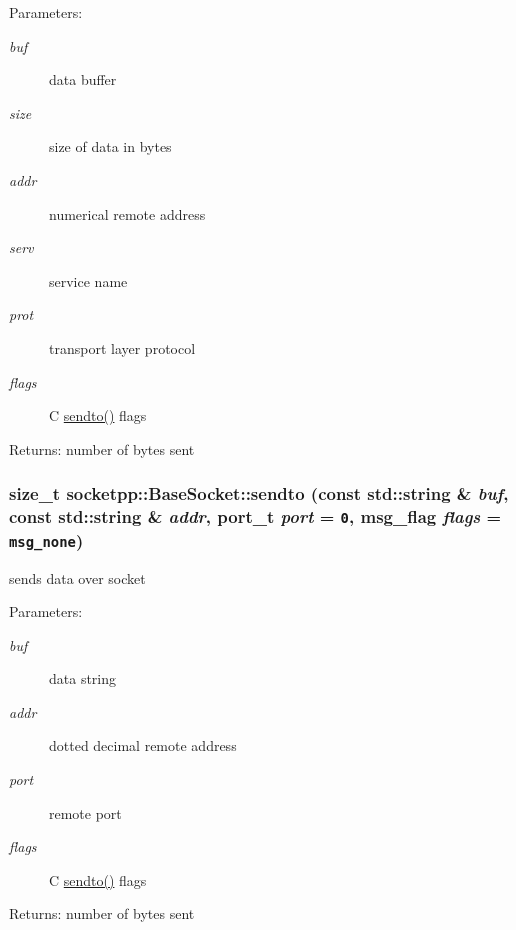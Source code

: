 \begin{CompactItemize}
\begin{Desc}
\item[Parameters:]
\begin{description}
\item[{\em buf}]data buffer \item[{\em size}]size of data in bytes \item[{\em addr}]numerical remote address \item[{\em serv}]service name \item[{\em prot}]transport layer protocol \item[{\em flags}]C \hyperlink{classsocketpp_1_1BaseSocket_d6df36281c6fce81e5c4c493ac91a6f8}{sendto()} flags \end{description}
\end{Desc}
\begin{Desc}
\item[Returns:]number of bytes sent \end{Desc}
\hypertarget{classsocketpp_1_1BaseSocket_63cabdd45f7985f6a63cf11eb2e031c5}{
\subsubsection[{sendto}]{\setlength{\rightskip}{0pt plus 5cm}size\_\-t socketpp::BaseSocket::sendto (const std::string \& {\em buf}, \/  const std::string \& {\em addr}, \/  port\_\-t {\em port} = {\tt 0}, \/  msg\_\-flag {\em flags} = {\tt msg\_\-none})}}
\label{classsocketpp_1_1BaseSocket_63cabdd45f7985f6a63cf11eb2e031c5}


sends data over socket 

\begin{Desc}
\item[Parameters:]
\begin{description}
\item[{\em buf}]data string \item[{\em addr}]dotted decimal remote address \item[{\em port}]remote port \item[{\em flags}]C \hyperlink{classsocketpp_1_1BaseSocket_d6df36281c6fce81e5c4c493ac91a6f8}{sendto()} flags \end{description}
\end{Desc}
\begin{Desc}
\item[Returns:]number of bytes sent \end{Desc}
\hypertarget{classsocketpp_1_1BaseSocket_33e5d93278884480c62a1586a2a4a114}{
}
\end{CompactItemize}
